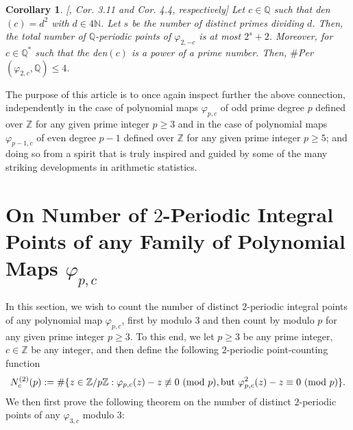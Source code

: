 \documentclass{article}
\theoremstyle{plain}
\newtheorem{cor}[thm]{Corollary}
\theoremstyle{definition}
\begin{document}
\begin{cor}\label{sha}[\cite{Shalom2, Shalom1}, Cor. 3.11 and Cor. 4.4, respectively]
Let $c\in \mathbb{Q}$ such that den$(c) = d^2$ with $d\in 4 \mathbb{N}$. Let $s$ be the number of distinct primes dividing $d$. Then, the total number of $\mathbb{Q}$-periodic points of $\varphi_{2, -c}$ is at most $2^s + 2$. Moreover, for $c\in \mathbb{Q^*}$ such that the den$(c)$ is a power of a prime number. Then, $\#$Per$(\varphi_{2, c}, \mathbb{Q}) \leq 4$.
\end{cor}

\noindent The purpose of this article is to once again inspect further the above connection, independently in the case of polynomial maps $\varphi_{p, c}$ of odd prime degree $p$ defined over $\mathbb{Z}$ for any given prime integer $p\geq 3$ and in the case of polynomial maps $\varphi_{p-1, c}$ of even degree $p-1$ defined over $\mathbb{Z}$ for any given prime integer $p\geq 5$; and doing so from a spirit that is truly inspired and guided by some of the many striking developments in arithmetic statistics.

\section{On Number of $2$-Periodic Integral Points of any Family of Polynomial Maps $\varphi_{p,c}$}\label{sec2}

In this section, we wish to count the number of distinct $2$-periodic integral points of any polynomial map $\varphi_{p,c}$, first by modulo 3 and then count by modulo $p$ for any given prime integer $p\geq 3$. To this end, we let $p\geq 3$ be any prime integer, $c\in \mathbb{Z}$ be any integer, and then define the following $2$-periodic point-counting function 
\begin{equation}\label{N_{c}}
N_{c}^{(2)}(p) := \#\{ z\in \mathbb{Z} / p\mathbb{Z} : \varphi_{p,c}(z) -z \not \equiv 0 \ \text{(mod $p$)}, \text{but} \ \varphi_{p,c}^2(z) - z \equiv 0 \ \text{(mod $p$)}\}.
\end{equation}\noindent We then first prove the following theorem on the number of distinct $2$-periodic points of any $\varphi_{3, c}$ modulo $3$:
\end{document}

